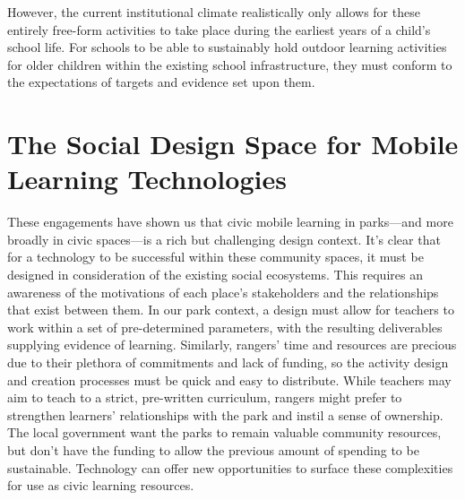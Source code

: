 However, the current institutional climate realistically only allows for these entirely free-form activities to take place during the earliest years of a child’s school life. For schools to be able to sustainably hold outdoor learning activities for older children within the existing school infrastructure, they must conform to the expectations of targets and evidence set upon them.

\section{The Social Design Space for Mobile Learning Technologies}

These engagements have shown us that civic mobile learning in parks---and more broadly in civic spaces---is a rich but challenging design context. It's clear that for a technology to be successful within these community spaces, it must be designed in consideration of the existing social ecosystems. This requires an awareness of the motivations of each place’s stakeholders and the relationships that exist between them. In our park context, a design must allow for teachers to work within a set of pre-determined parameters, with the resulting deliverables supplying evidence of learning. Similarly, rangers’ time and resources are precious due to their plethora of commitments and lack of funding, so the activity design and creation processes must be quick and easy to distribute. While teachers may aim to teach to a strict, pre-written curriculum, rangers might prefer to strengthen learners’ relationships with the park and instil a sense of ownership. The local government want the parks to remain valuable community resources, but don’t have the funding to allow the previous amount of spending to be sustainable. Technology can offer new opportunities to surface these complexities for use as civic learning resources.


